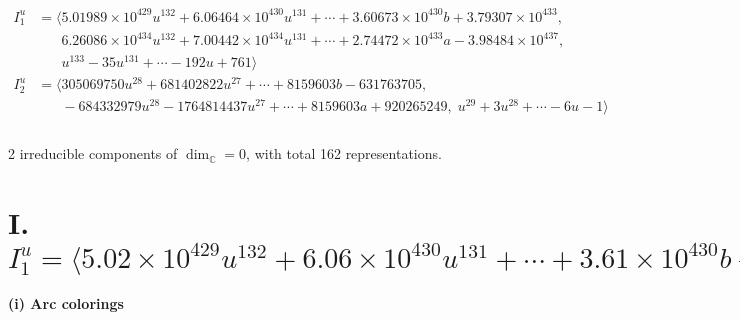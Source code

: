\documentclass[1p]{elsarticle_modified}
\theoremstyle{definition}
\begin{document}
\begin{align*}
I^u_{1}&=\langle 
5.01989\times10^{429} u^{132}+6.06464\times10^{430} u^{131}+\cdots+3.60673\times10^{430} b+3.79307\times10^{433},\\
\phantom{I^u_{1}}&\phantom{= \langle  }6.26086\times10^{434} u^{132}+7.00442\times10^{434} u^{131}+\cdots+2.74472\times10^{433} a-3.98484\times10^{437},\\
\phantom{I^u_{1}}&\phantom{= \langle  }u^{133}-35 u^{131}+\cdots-192 u+761\rangle \\
I^u_{2}&=\langle 
305069750 u^{28}+681402822 u^{27}+\cdots+8159603 b-631763705,\\
\phantom{I^u_{2}}&\phantom{= \langle  }-684332979 u^{28}-1764814437 u^{27}+\cdots+8159603 a+920265249,\;u^{29}+3 u^{28}+\cdots-6 u-1\rangle \\
\\
\end{align*}
\raggedright * 2 irreducible components of $\dim_{\mathbb{C}}=0$, with total 162 representations.\\
\newpage
\renewcommand{\arraystretch}{1}
\centering \section*{I. $I^u_{1}= \langle 5.02\times10^{429} u^{132}+6.06\times10^{430} u^{131}+\cdots+3.61\times10^{430} b+3.79\times10^{433},\;6.26\times10^{434} u^{132}+7.00\times10^{434} u^{131}+\cdots+2.74\times10^{433} a-3.98\times10^{437},\;u^{133}-35 u^{131}+\cdots-192 u+761 \rangle$}
\flushleft \textbf{(i) Arc colorings}\\
\end{document}
